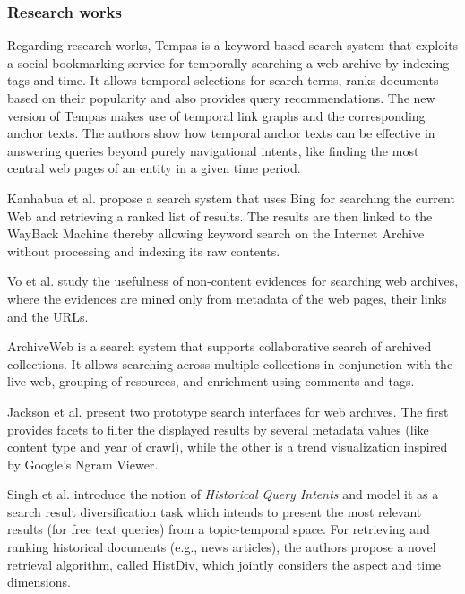 \documentclass[twocolumn]{svjour3}
\begin{document}
\subsubsection*{Research works}

Regarding research works,
Tempas \cite{holzmann2016tempas}
is a keyword-based search system that exploits a social bookmarking service for
temporally searching a web archive by indexing tags and time.
It allows temporal selections
for search terms, ranks documents based on their
popularity and also provides query recommendations.
The new version of Tempas \cite{holzmann2017exploring}
makes use of temporal link graphs and the corresponding anchor texts.
The authors show how temporal anchor texts can be effective in answering
queries beyond purely navigational intents,
like finding the most central web pages of an entity in a given time period.

Kanhabua et al. \cite{kanhabua2016search}
propose a search system that uses Bing for searching the current Web
and retrieving a ranked list of results.
The results are then linked to the WayBack Machine
thereby allowing keyword search on the Internet Archive without processing
and indexing its raw contents.

Vo et al. \cite{vo2016can}
study the usefulness of non-content evidences
for searching web archives,
where the evidences are mined only from metadata of the web pages,
their links and the URLs.

ArchiveWeb \cite{fernando2016archiveweb}
is a search system that supports collaborative search
of archived collections.
It allows searching across multiple collections
in conjunction with the live web,
grouping of resources,
and enrichment using comments and tags.

Jackson et al.\cite{jackson2016desiderata} present two prototype
search interfaces for web archives.
The first provides facets to filter the displayed results by several metadata values
(like content type and year of crawl), while
the other is a trend visualization inspired by Google's Ngram Viewer.

Singh et al.\cite{singh2016history}
introduce the notion of {\em Historical Query Intents}
and model it as a search result diversification task
which intends to present the most relevant results (for free text queries) from a
topic-temporal space.
For retrieving and ranking historical documents (e.g., news articles),
the authors propose a novel retrieval algorithm, called HistDiv,
which jointly considers the aspect and time dimensions.
\end{document}
